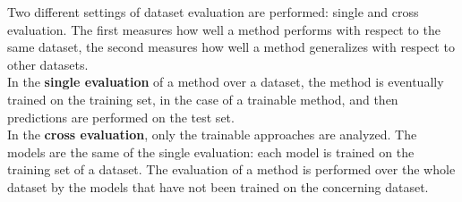 Two different settings of dataset evaluation are performed: single and cross evaluation.
The first measures how well a method performs with respect to the same dataset, the second measures how well a method generalizes with respect to other datasets.\\
In the \textbf{single evaluation} of a method over a dataset, the method is eventually trained on the training set, in the case of a trainable method, and then predictions are performed on the test set.\\
In the \textbf{cross evaluation}, only the trainable approaches are analyzed.
The models are the same of the single evaluation: each model is trained on the training set of a dataset.
The evaluation of a method is performed over the whole dataset by the models that have not been trained on the concerning dataset.

